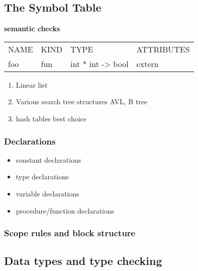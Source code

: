 \documentclass[11pt]{article}
\begin{document}
\subsection{The Symbol Table}
\label{sec:org7d48f16}
\textbf{semantic checks}

\begin{center}
\begin{tabular}{llll}
NAME & KIND & TYPE & ATTRIBUTES\\
foo & fun & int * int -> bool & extern\\
\end{tabular}
\end{center}

\begin{enumerate}
\item Linear list
\item Various search tree structures
AVL, B tree
\item hash tables
best choice
\end{enumerate}
\subsubsection{Declarations}
\label{sec:org397a9d8}
\begin{itemize}
\item constant declarations
\item type declarations
\item variable declarations
\item procedure/function declarations
\end{itemize}
\subsubsection{Scope rules and block structure}
\label{sec:org74ffefa}
\subsection{Data types and type checking}
\label{sec:org0bca174}
\end{document}
